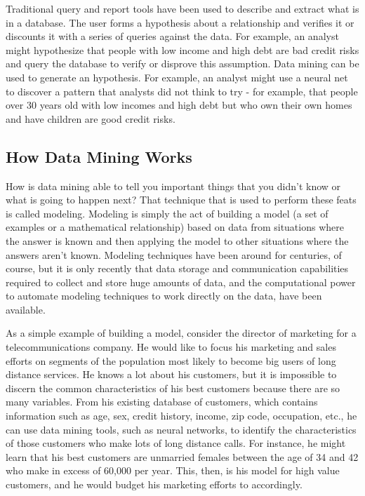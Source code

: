 Traditional query and report tools have been used to describe and extract what is in a database. The user forms a hypothesis about a relationship and verifies it or discounts it with a series of queries against the data. For example, an analyst might hypothesize that people with low income and high debt are bad credit risks and query the database to verify or disprove this assumption. Data mining can be used to generate an hypothesis. For example, an analyst might use a neural net to discover a pattern that analysts did not think to try - for example, that people over 30 years old with low incomes and high debt but who own their own homes and have children are good credit risks.

\subsection{How Data Mining Works}
How is data mining able to tell you important things that you didn't know or what is going to happen next? That technique that is used to perform these feats is called modeling. Modeling is simply the act of building a model (a set of examples or a mathematical relationship) based on data from situations where the answer is known and then applying the model to other situations where the answers aren't known. Modeling techniques have been around for centuries, of course, but it is only recently that data storage and communication capabilities required to collect and store huge amounts of data, and the computational power to automate modeling techniques to work directly on the data, have been available.

As a simple example of building a model, consider the director of marketing for a telecommunications company. He would like to focus his marketing and sales efforts on segments of the population most likely to become big users of long distance services. He knows a lot about his customers, but it is impossible to discern the common characteristics of his best customers because there are so many variables. From his existing database of customers, which contains information such as age, sex, credit history, income, zip code, occupation, etc., he can use data mining tools, such as neural networks, to identify the characteristics of those customers who make lots of long distance calls. For instance, he might learn that his best customers are unmarried females between the age of 34 and 42 who make in excess of 60,000 per year. This, then, is his model for high value customers, and he would budget his marketing efforts to accordingly.

